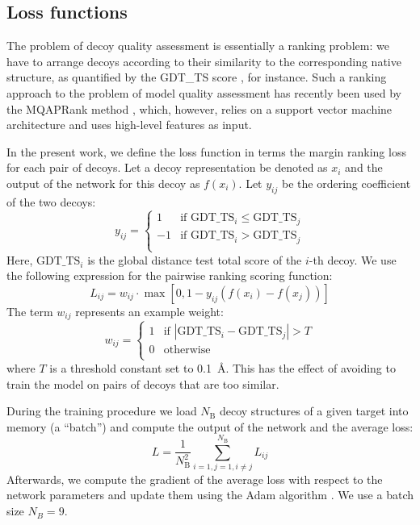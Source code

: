 \subsection{Loss functions}
The problem of decoy quality assessment is essentially a ranking
problem: we have to arrange decoys according to their similarity to
the corresponding native structure, as quantified by the GDT\_TS score
\cite{zemla2001casp4}, for instance. Such a ranking approach to the
problem of model quality assessment has recently been used by the
MQAPRank method \cite{jing2016sorting}, which, however, relies on a
support vector machine architecture and uses high-level features as
input.

In the present work, we define the loss function in terms the margin
ranking loss for each pair of decoys. Let a decoy representation be
denoted as $x_i$ and the output of the network for this decoy as
$f(x_i)$. Let $y_{ij}$ be the ordering coefficient of the two decoys:
$$
y_{ij} = \begin{cases}
               1& \text{if }\text{GDT\_TS}_i \leq \text{GDT\_TS}_j \\
               -1& \text{if }\text{GDT\_TS}_i > \text{GDT\_TS}_j \\
            \end{cases}
$$
%
Here, $\text{GDT\_TS}_i$ is the global distance test total score of
the $i$-th decoy. We use the following expression for the pairwise
ranking scoring function:
$$
L_{ij} = w_{ij} \cdot \max \left[ 0, 1 - y_{ij} \left( f \left( x_i \right) - f \left( x_j \right) \right) \right]
$$
%
The term $w_{ij}$ represents an example weight:
%
$$
w_{ij} = \begin{cases}
               1& \text{if } \left| \text{GDT\_TS}_i - \text{GDT\_TS}_j \right| > T \\
               0& \text{otherwise} \\ 
            \end{cases}
$$
%
where $T$ is a threshold constant set to 0.1~{\AA}. This has the
effect of avoiding to train the model on pairs of decoys that are too
similar.

During the training procedure we load $N_\text{B}$ decoy structures of
a given target into memory (a ``batch'') and compute the output of the
network and the average loss:
$$ L = \frac{1}{N^{2}_\text{B}} \sum_{i=1,j=1, i \neq j}^{N_\text{B}} L_{ij} $$
Afterwards, we compute the gradient of the average loss with respect
to the network parameters and update them using the Adam algorithm
\cite{kingma2014adam}. We use a batch size $N_B = 9$.


